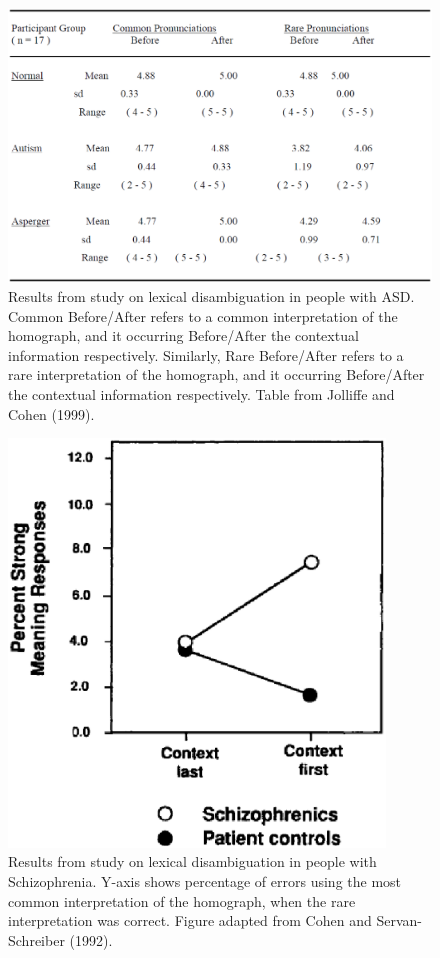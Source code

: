 \begin{figure}[tp]
\begin{center}
	\includegraphics[width=115mm]{figures/asd_lexamb_study_results.eps}
\end{center}
\caption{Results from study on lexical disambiguation in people with ASD.  Common Before/After refers to a common interpretation of the homograph, and it occurring Before/After the contextual information respectively.  Similarly, Rare Before/After refers to a rare interpretation of the homograph, and it occurring Before/After the contextual information respectively.  Table from Jolliffe and Cohen (1999).}
\label{asd-lexamb-study}
\end{figure} 

\begin{figure}[tp]
\begin{center}
	\includegraphics[width=100mm]{figures/schiz_lexamb_study_results.eps}
\end{center}
\caption{Results from study on lexical disambiguation in people with Schizophrenia.  Y-axis shows percentage of errors using the most common interpretation of the homograph, when the rare interpretation was correct.  Figure adapted from Cohen and Servan-Schreiber (1992).}
\label{schiz-lexamb-study}
\end{figure} 

